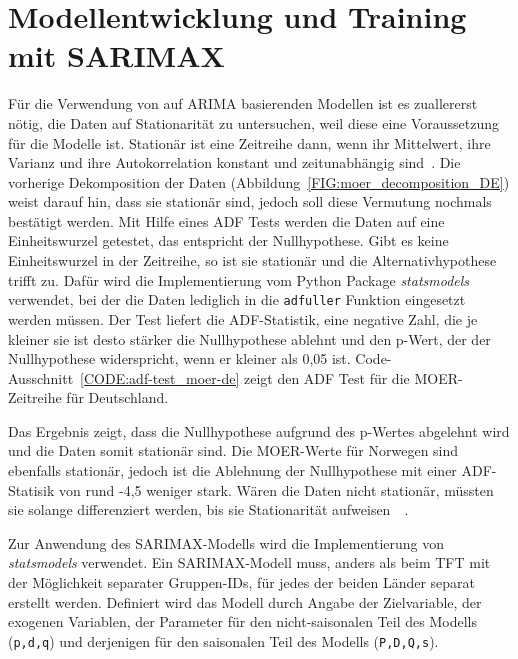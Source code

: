 \section{Modellentwicklung und Training mit SARIMAX}\label{CAP:SARIMAX-training}
Für die Verwendung von auf \ac{ARIMA} basierenden Modellen ist es zuallererst nötig, die Daten auf Stationarität zu untersuchen, weil diese eine Voraussetzung für die Modelle ist.
Stationär ist eine Zeitreihe dann, wenn ihr Mittelwert, ihre Varianz und ihre Autokorrelation konstant und zeitunabhängig sind~\cite{Peixeiro.2022}.
Die vorherige Dekomposition der Daten (Abbildung~\ref{FIG:moer_decomposition_DE}) weist darauf hin, dass sie stationär sind, jedoch soll diese Vermutung nochmals bestätigt werden.
Mit Hilfe eines \ac{ADF} Tests werden die Daten auf eine Einheitswurzel getestet, das entspricht der Nullhypothese.
Gibt es keine Einheitswurzel in der Zeitreihe, so ist sie stationär und die Alternativhypothese trifft zu.
Dafür wird die Implementierung vom Python Package \textit{statsmodels} verwendet, bei der die Daten lediglich in die \lstinline[columns=fixed]{adfuller} Funktion eingesetzt werden müssen.
Der Test liefert die ADF-Statistik, eine negative Zahl, die je kleiner sie ist desto stärker die Nullhypothese ablehnt und den p-Wert, der der Nullhypothese widerspricht, wenn er kleiner als 0,05 ist.
Code-Ausschnitt~\ref{CODE:adf-test_moer-de} zeigt den \ac{ADF} Test für die \ac{MOER}-Zeitreihe für Deutschland.
\begin{minipage}{\linewidth}

\end{minipage}
Das Ergebnis zeigt, dass die Nullhypothese aufgrund des p-Wertes abgelehnt wird und die Daten somit stationär sind.
Die \ac{MOER}-Werte für Norwegen sind ebenfalls stationär, jedoch ist die Ablehnung der Nullhypothese mit einer ADF-Statisik von rund -4,5 weniger stark.
Wären die Daten nicht stationär, müssten sie solange differenziert werden, bis sie Stationarität aufweisen~\cite{Peixeiro.2022}~\cite{Rahmadhan.8.5.2023}.

Zur Anwendung des SARIMAX-Modells wird die Implementierung von \textit{statsmodels} verwendet.
Ein SARIMAX-Modell muss, anders als beim \ac{TFT} mit der Möglichkeit separater Gruppen-IDs, für jedes der beiden Länder separat erstellt werden.
Definiert wird das Modell durch Angabe der Zielvariable, der exogenen Variablen, der Parameter für den nicht-saisonalen Teil des Modells (\lstinline[columns=fixed]{p,d,q}) und derjenigen für den saisonalen Teil des Modells (\lstinline[columns=fixed]{P,D,Q,s}).

